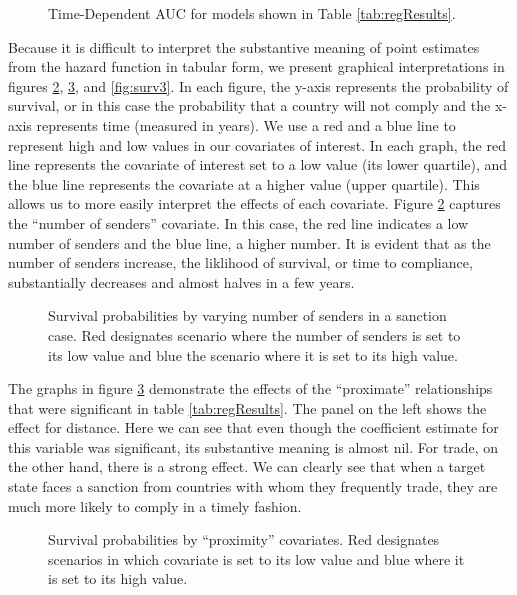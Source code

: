\begin{figure}[ht]
	\centering
	\caption{Time-Dependent AUC for models shown in Table \ref{tab:regResults}.}
	\resizebox{0.8\textwidth}{!}{}
	\label{fig:auc}
\end{figure}
\FloatBarrier

Because it is difficult to interpret the substantive meaning of point estimates from the hazard function in tabular form, we present graphical interpretations in figures \ref{fig:surv1}, \ref{fig:surv2}, and \ref{fig:surv3}. In each figure, the y-axis represents the probability of survival, or in this case the probability that a country will not comply and the x-axis represents time (measured in years). We use a red and a blue line to represent high and low values in our covariates of interest. In each graph, the red line represents the covariate of interest set to a low value (its lower quartile), and the blue line represents the covariate at a higher value (upper quartile). This allows us to more easily interpret the effects of each covariate. Figure \ref{fig:surv1} captures the ``number of senders'' covariate. In this case, the red line indicates a low number of senders and the blue line, a higher number. It is evident that as the number of senders increase, the liklihood of survival, or time to compliance, substantially decreases and almost halves in a few years. 

\begin{figure}[ht]
	\centering
	\caption{Survival probabilities by varying number of senders in a sanction case. Red designates scenario where the number of senders is set to its low value and blue the scenario where it is set to its high value.}
	\resizebox{0.7\textwidth}{!}{}
	\label{fig:surv1}
\end{figure}
\FloatBarrier

The graphs in figure \ref{fig:surv2} demonstrate the effects of the ``proximate'' relationships that were significant in table \ref{tab:regResults}. The panel on the left shows the effect for distance. Here we can see that even though the coefficient estimate for this variable was significant, its substantive meaning is almost nil. For trade, on the other hand, there is a strong effect. We can clearly see that when a target state faces a sanction from countries with whom they frequently trade, they are much more likely to comply in a timely fashion.

\begin{figure}[ht]
	\centering
	\caption{Survival probabilities by ``proximity'' covariates. Red designates scenarios in which covariate is set to its low value and blue where it is set to its high value.}
	\resizebox{1\textwidth}{!}{}	
	\label{fig:surv2}
\end{figure}
\FloatBarrier

